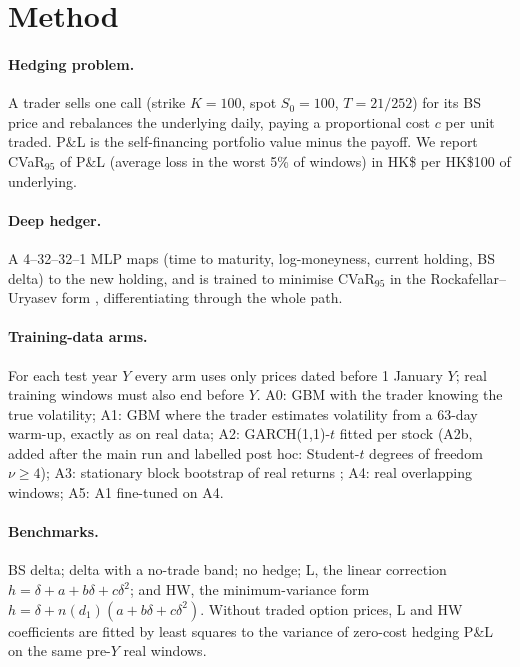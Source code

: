 \documentclass[11pt]{article}
\begin{document}
\section{Method}
\paragraph{Hedging problem.} A trader sells one call (strike $K=100$, spot $S_0=100$, $T=21/252$)
for its BS price and rebalances the underlying daily, paying a proportional cost $c$ per unit traded.
P\&L is the self-financing portfolio value minus the payoff. We report CVaR$_{95}$ of P\&L
(average loss in the worst 5\% of windows) in HK\$ per HK\$100 of underlying.

\paragraph{Deep hedger.} A 4--32--32--1 MLP maps (time to maturity, log-moneyness, current holding,
BS delta) to the new holding, and is trained to minimise CVaR$_{95}$ in the Rockafellar--Uryasev form
\citep{rockafellar2000optimization}, differentiating through the whole path.

\paragraph{Training-data arms.} For each test year $Y$ every arm uses only prices dated before
1 January $Y$; real training windows must also end before $Y$.
A0: GBM with the trader knowing the true volatility; A1: GBM where the trader estimates volatility
from a 63-day warm-up, exactly as on real data; A2: GARCH(1,1)-$t$ fitted per stock (A2b, added after
the main run and labelled post hoc: Student-$t$ degrees of freedom $\nu\ge 4$); A3: stationary block
bootstrap of real returns \citep{politis1994stationary}; A4: real overlapping windows; A5: A1 fine-tuned on A4.

\paragraph{Benchmarks.} BS delta; delta with a no-trade band; no hedge; L, the linear correction
$h=\delta+a+b\delta+c\delta^2$; and HW, the \citet{hull2017optimal} minimum-variance form
$h=\delta+n(d_1)(a+b\delta+c\delta^2)$. Without traded option prices, L and HW coefficients are
fitted by least squares to the variance of zero-cost hedging P\&L on the same pre-$Y$ real windows.
\end{document}

